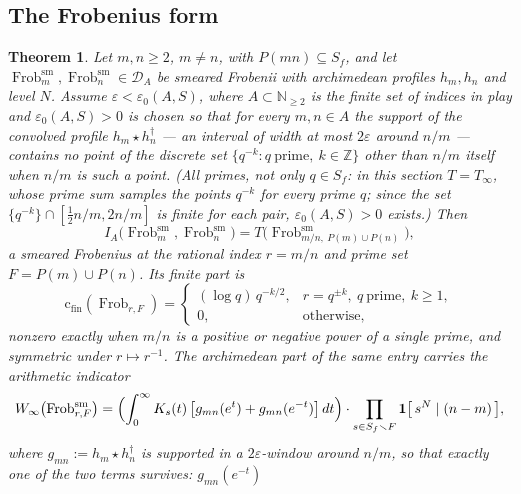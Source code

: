\documentclass[11pt]{amsart}
\newtheorem{theorem}{Theorem}[section]
\theoremstyle{definition}
\theoremstyle{remark}
\newcommand{\N}{\mathbb N}
\newcommand{\Z}{\mathbb Z}
\newcommand{\Frob}{\operatorname{Frob}}
\newcommand{\DA}{\mathcal D_A}
\newcommand{\cfin}{\mathrm{c}_{\mathrm{fin}}}
\begin{document}
\subsection{The Frobenius form}

\begin{theorem}\label{thm:gramoff}
Let $m,n\ge2$, $m\ne n$, with $P(mn)\subseteq S_f$, and let
$\Frob_m^{\mathrm{sm}},\Frob_n^{\mathrm{sm}}\in\DA$ be smeared Frobenii with
archimedean profiles $h_m,h_n$ and level $N$. Assume
$\varepsilon<\varepsilon_0(A,S)$, where $A\subset\N_{\ge2}$ is the finite set
of indices in play and $\varepsilon_0(A,S)>0$ is chosen so that for every
$m,n\in A$ the support of the convolved profile $h_m\star h_n^\dagger$ --- an
interval of width at most $2\varepsilon$ around $n/m$ --- contains no point of
the discrete set $\{q^{-k}:q\ \text{prime},\ k\in\Z\}$ other than $n/m$
itself when $n/m$ is such a point. (All primes, not only $q\in S_f$: in this
section $T=T_\infty$, whose prime sum samples the points $q^{-k}$ for every
prime $q$; since the set $\{q^{-k}\}\cap[\tfrac12 n/m,2n/m]$ is finite for
each pair, $\varepsilon_0(A,S)>0$ exists.) Then
\begin{equation}\label{eq:gramoffentry}
  I_A\bigl(\Frob_m^{\mathrm{sm}},\Frob_n^{\mathrm{sm}}\bigr)
   =T\bigl(\Frob^{\mathrm{sm}}_{m/n,\ P(m)\cup P(n)}\bigr),
\end{equation}
a smeared Frobenius at the rational index $r=m/n$ and prime set
$F=P(m)\cup P(n)$. Its finite part is
\begin{equation}\label{eq:gramfinite}
  \cfin(\Frob_{r,F})=
  \begin{cases}
    (\log q)\,q^{-k/2}, & r=q^{\pm k},\ q\ \text{prime},\ k\ge1,\\
    0, & \text{otherwise},
  \end{cases}
\end{equation}
nonzero exactly when $m/n$ is a positive or negative power of a single prime,
and symmetric under $r\mapsto r^{-1}$. The archimedean part of the same entry
carries the arithmetic indicator
\begin{equation}\label{eq:gramarch}
  W_\infty\bigl(\Frob_{r,F}^{\mathrm{sm}}\bigr)
   =\Bigl(\int_0^\infty K_s(t)\,\bigl[g_{mn}(e^{t})+g_{mn}(e^{-t})\bigr]\,dt\Bigr)
    \cdot\prod_{s\in S_f\smallsetminus F}
    \mathbf 1\bigl[\,s^N\mid(n-m)\,\bigr],
\end{equation}
where $g_{mn}:=h_m\star h_n^\dagger$ is supported in a $2\varepsilon$-window
around $n/m$, so that exactly one of the two terms survives: $g_{mn}(e^{-t})$

\end{theorem}
\end{document}
